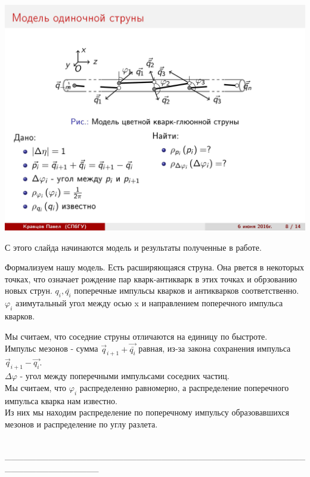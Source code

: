 \documentclass[14pt]{article}
\renewcommand{\phi}{\varphi}
\renewcommand{\line}{\\ \_\_\_\_\_\_\_\_\_\_\_\_\_\_\_\_\_\_\_\_\_\_\_\_\_\_\_\_\_\_\_\_\_\_\_\_\_\_\_\_\_\_\_\_\_\_\_\_\_\_\_\_\_\_\_\_\_\_\_\_\_\_\_ \\ }
\begin{document}
\begin{minipage}[h]{0.33\linewidth}
\includegraphics[width=1\linewidth]{page-08.jpg}
\end{minipage}
\begin{minipage}[h]{0.65\linewidth}
С этого слайда начинаются модель и результаты полученные в работе.

Формализуем нашу модель. Есть расширяющаяся струна. Она рвется в некоторых точках, что означает рождение пар кварк-антикварк в этих точках и обрзованию новых струн. $q_i, \bar{q_i}$ поперечные импульсы кварков и антикварков соответственно. $\phi_i$ азимутальный угол между осью x и направлением поперечного импульса кварков.

Мы считаем, что соседние струны отличаются на единицу по быстроте. \\
Импульс мезонов - сумма  $\vec{q}_{i+1} + \vec{\bar{q_i}}$ равная, из-за закона сохранения импульса $\vec{q}_{i+1} - \vec{q_i}$. \\
$\Delta \phi$ - угол между поперечными импульсами соседних частиц. \\
Мы считаем, что $\phi_i$ распределенно равномерно, а распределение поперечного импульса кварка нам известно. \\
Из них мы находим распределение по поперечному импульсу образовавшихся мезонов и распределение по углу разлета.
\end{minipage}
\line
\end{document}
